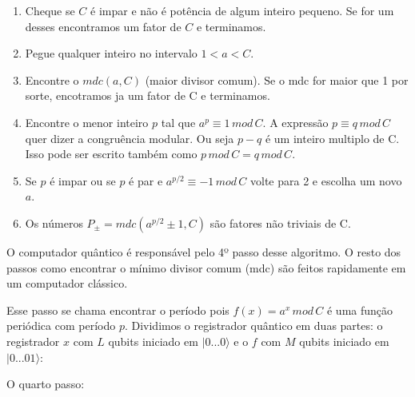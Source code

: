 \documentclass[12pt,a4paper]{article}
\begin{document}
\begin{enumerate}

 \item Cheque se $C$ é impar e não é potência de algum inteiro pequeno. Se for um desses encontramos um fator de $C$ e terminamos.

 \item Pegue qualquer inteiro no intervalo $1 < a < C$.

 \item Encontre o $mdc(a, C)$ (maior divisor comum). Se o mdc for maior que 1 por sorte, encotramos ja um fator de C e terminamos.

 \item Encontre o menor inteiro $p$ tal que $a^{p} \equiv 1\, mod\, C$. A expressão  $p \equiv q \, mod\, C$ quer dizer a congruência modular. Ou seja $p-q$ é um inteiro multiplo de C. Isso pode ser escrito também como $p\, mod\, C = q\, mod\, C$.

 \item Se $p$ é impar ou se $p$ é par e $a^{p/2} \equiv -1\, mod\, C$ volte para 2 e escolha um novo $a$.

 \item Os números $P_{\pm} = mdc( a^{p/2} \pm 1, C)$ são fatores não triviais de C.

\end{enumerate}

O computador quântico é responsável pelo 4º passo desse algoritmo. O resto dos passos como encontrar o mínimo divisor comum (mdc) são feitos rapidamente em um computador clássico.

Esse passo se chama encontrar o período pois $f(x)=a^{x} \, mod \, C$ é uma função periódica com período $p$. Dividimos o registrador quântico em duas partes: o registrador $x$ com $L$ qubits iniciado em $|0...0\rangle$ e o $f$ com $M$ qubits iniciado em $|0...01\rangle$:

O quarto passo:
\end{document}
